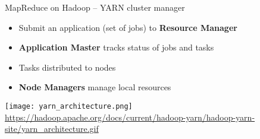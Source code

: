 \documentclass[ignorenonframetext,xcolor=x11names]{beamer}
\begin{document}




\begin{frame}{MapReduce on Hadoop -- YARN cluster manager}
\begin{itemize}
   \item Submit an application (set of jobs) to \textbf{Resource Manager}
   \item \textbf{Application Master} tracks status of jobs and tasks
   \item Tasks distributed to nodes
   \item \textbf{Node Managers} manage local resources
\end{itemize}

\centering
\texttt{[image: yarn\_architecture.png]}\\

\scriptsize\url{https://hadoop.apache.org/docs/current/hadoop-yarn/hadoop-yarn-site/yarn_architecture.gif}\normalsize

\end{frame}
\end{document}
